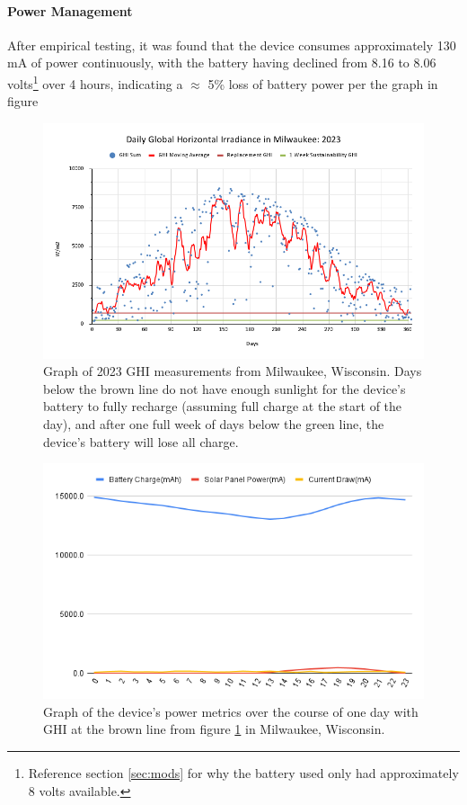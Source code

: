 \documentclass[fleqn,10pt]{SelfArx} %
\begin{document}
	\paragraph*{Power Management}
	After empirical testing, it was found that the device consumes approximately 130 mA of power continuously, with the battery having declined from 8.16 to 8.06 volts\footnote{Reference section \ref{sec:mods} for why the battery used only had approximately 8 volts available.} over 4 hours, indicating a $\approx$ 5\% loss of battery power per the graph in figure 
	
	\begin{figure}[h]
		\centering
		\includegraphics[width=1\linewidth]{Figures/MKE_GHI}
		\caption[Daily GHI in Milwaukee]{Graph of 2023 GHI measurements from Milwaukee, Wisconsin. Days below the brown line do not have enough sunlight for the device's battery to fully recharge (assuming full charge at the start of the day), and after one full week of days below the green line, the device's battery will lose all charge.}
		\label{fig:GHI}
	\end{figure} 
	
	\begin{figure}[h]
		\centering
		\includegraphics[width=1\linewidth]{Figures/brown_line_power}
		\caption[Power Consumption Graph]{Graph of the device's power metrics over the course of one day with GHI at the brown line from figure \ref{fig:GHI} in Milwaukee, Wisconsin.}
		\label{fig:ElecMod}
	\end{figure} 
	
\end{document}
